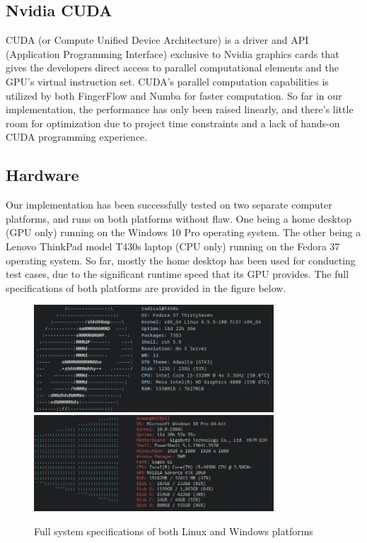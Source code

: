 \documentclass[fyp]{socreport}
\begin{document}
\subsection{Nvidia CUDA}
CUDA (or Compute Unified Device Architecture) is a driver and API (Application Programming Interface) exclusive to Nvidia graphics cards that gives the developers direct access to parallel computational elements and the GPU's virtual instruction set. CUDA's parallel computation capabilities is utilized by both FingerFlow and Numba for faster computation. So far in our implementation, the performance has only been raised linearly, and there's little room for optimization due to project time constraints and a lack of hands-on CUDA programming experience.

\subsection{Hardware}
Our implementation has been successfully tested on two separate computer platforms, and runs on both platforms without flaw. One being a home desktop (GPU only) running on the Windows 10 Pro operating system. The other being a Lenovo ThinkPad model T430s laptop (CPU only) running on the Fedora 37 operating system. So far, mostly the home desktop has been used for conducting test cases, due to the significant runtime speed that its GPU provides. The full specifications of both platforms are provided in the figure below.

\begin{figure}[H]
	\centering
	\includegraphics[width=0.8\textwidth]
	{linux_specs}
	\includegraphics[width=0.8\textwidth]
	{windows_specs}
	\caption{Full system specifications of both Linux and Windows platforms}
\end{figure}
\end{document}
